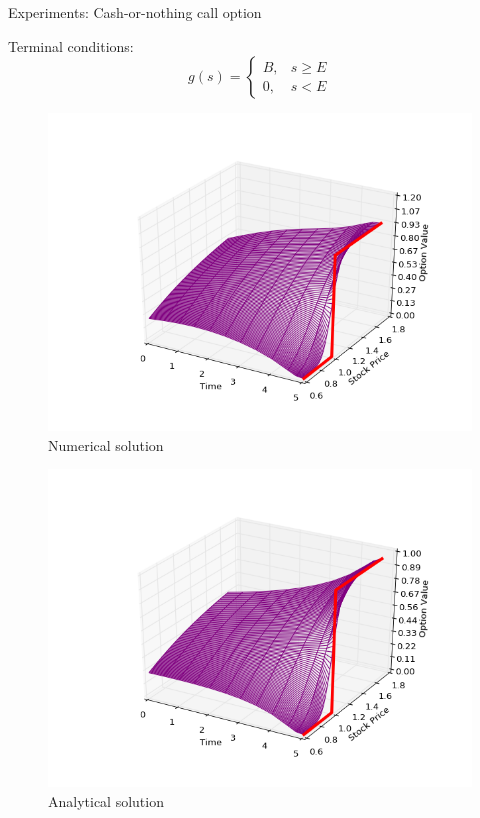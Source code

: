 \documentclass{beamer}
\theoremstyle{definition}
\theoremstyle{plain}
\theoremstyle{remark}
\begin{document}
		\begin{frame}{Experiments: Cash-or-nothing call option}
		
				 Terminal conditions:	 
		 \[
			g(s)=\begin{cases} B, & s\geq E \\
			0, & s< E \end{cases}
		 \]	
\begin{minipage}{\linewidth}
      \centering
      \begin{minipage}{0.45\linewidth}
          \begin{figure}[H]
              \includegraphics[width=\linewidth]{Figures/c-o-n-call}
              \caption{Numerical solution}
          \end{figure}
      \end{minipage}
      \hspace{0.05\linewidth}
      \begin{minipage}{0.45\linewidth}
          \begin{figure}[H]
              \includegraphics[width=\linewidth]{Figures/c-o-n-call-analyt}
              \caption{Analytical solution}
          \end{figure}
      \end{minipage}
  \end{minipage}	 	 
		\end{frame}
		
\end{document}
